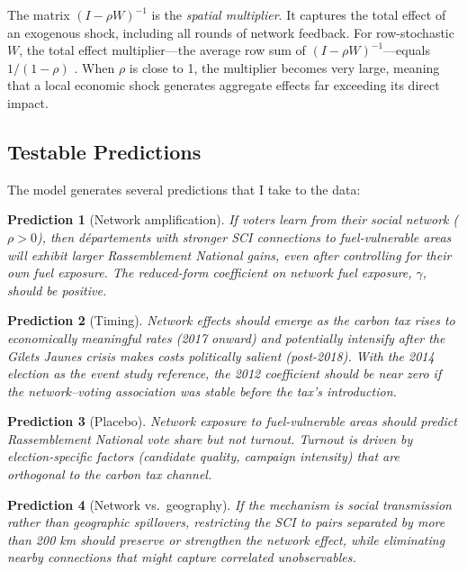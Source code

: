 \documentclass[12pt]{article}
\newcommand{\rn}{Rassemblement National}
\newcommand{\gj}{\textit{Gilets Jaunes}}
\newcommand{\depts}{d\'{e}partements}
\newtheorem{prediction}{Prediction}
\begin{document}
The matrix $(I - \rho W)^{-1}$ is the \textit{spatial multiplier}. It captures the total effect of an exogenous shock, including all rounds of network feedback. For row-stochastic $W$, the total effect multiplier---the average row sum of $(I - \rho W)^{-1}$---equals $1/(1-\rho)$ \citep{lesage2009introduction}. When $\rho$ is close to 1, the multiplier becomes very large, meaning that a local economic shock generates aggregate effects far exceeding its direct impact.

\subsection{Testable Predictions}

The model generates several predictions that I take to the data:

\begin{prediction}[Network amplification]
If voters learn from their social network ($\rho > 0$), then \depts{} with stronger SCI connections to fuel-vulnerable areas will exhibit larger \rn{} gains, even after controlling for their own fuel exposure. The reduced-form coefficient on network fuel exposure, $\gamma$, should be positive.
\end{prediction}

\begin{prediction}[Timing]
Network effects should emerge as the carbon tax rises to economically meaningful rates (2017 onward) and potentially intensify after the \gj{} crisis makes costs politically salient (post-2018). With the 2014 election as the event study reference, the 2012 coefficient should be near zero if the network--voting association was stable before the tax's introduction.
\end{prediction}

\begin{prediction}[Placebo]
Network exposure to fuel-vulnerable areas should predict \rn{} vote share but not turnout. Turnout is driven by election-specific factors (candidate quality, campaign intensity) that are orthogonal to the carbon tax channel.
\end{prediction}

\begin{prediction}[Network vs.\ geography]
If the mechanism is social transmission rather than geographic spillovers, restricting the SCI to pairs separated by more than 200 km should preserve or strengthen the network effect, while eliminating nearby connections that might capture correlated unobservables.
\end{prediction}
\end{document}
